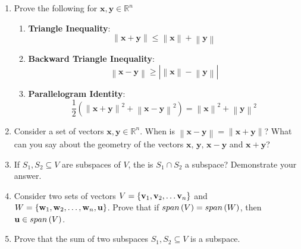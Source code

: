 \begin{enumerate}
    \item Prove the following for $\mathbf{x}, \mathbf{y} \in \mathbb{R}^n$
    \begin{enumerate}
        \item {\small \textbf{Triangle Inequality}}:
        $$\left\lVert \mathbf{x} + \mathbf{y}\right\rVert \leq \left\lVert \mathbf{x}\right\rVert + \left\lVert \mathbf{y}\right\rVert$$
        \item {\small \textbf{Backward Triangle Inequality}}:
        $$\left\lVert \mathbf{x} - \mathbf{y}\right\rVert  \geq \left\lvert \left\lVert \mathbf{x}\right\rVert - \left\lVert \mathbf{y}\right\rVert \right\rvert$$
        \item {\small \textbf{Parallelogram Identity}}:
        $$\frac{1}{2} \left(\left\lVert \mathbf{x} + \mathbf{y}\right\rVert^2 + \left\lVert \mathbf{x} - \mathbf{y}\right\rVert^2 \right) = \left\lVert \mathbf{x}\right\rVert^2 + \left\lVert \mathbf{y}\right\rVert^2$$
    \end{enumerate}

    \item Consider a set of vectors $\mathbf{x}, \mathbf{y} \in \mathbb{R}^n$. When is $\left\lVert \mathbf{x} - \mathbf{y} \right\rVert = \left\lVert \mathbf{x} + \mathbf{y}\right\rVert$? What can you say about the geometry of the vectors $\mathbf{x},\,\mathbf{y},\,\mathbf{x} - \mathbf{y}$ and $\mathbf{x} + \mathbf{y}$?
    
    \item If $S_1, S_2 \subseteq V$ are subspaces of $V$, the is $S_1 \cap S_2$ a subspace? Demonstrate your answer.

    \item Consider two sets of vectors $V = \left\{ \mathbf{v}_1, \mathbf{v}_2, \ldots \mathbf{v}_n\right\}$ and $W = \left\{ \mathbf{w}_1, \mathbf{w}_2, \ldots, \mathbf{w}_n, \mathbf{u}\right\}$. Prove that if $span\left( V\right) = span\left( W\right)$, then $\mathbf{u} \in span\left( V\right)$.
    
    \item Prove that the sum of two subspaces $S_1, S_2 \subseteq V$ is a subspace.
    

\end{enumerate}
